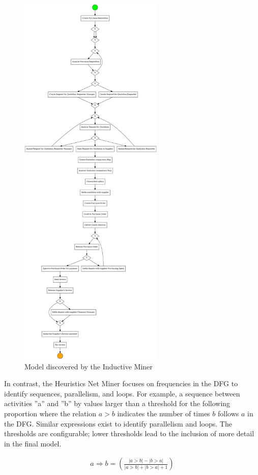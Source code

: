 \begin{figure}
\centering
\includegraphics[height=7.25in]{bpmn.png}
\caption{Model discovered by the Inductive Miner}
\label{fig:inductive_example}
\end{figure}

In contrast, the Heuristics Net Miner focuses on frequencies in the DFG to identify sequences, parallelism, and loops. For example, a sequence between activities ''a'' and ''b'' by values larger than a threshold for the following proportion where the relation $a > b$ indicates the number of times $b$ follows $a$ in the DFG. Similar expressions exist to identify parallelism and loops. The thresholds are configurable; lower thresholds lead to the inclusion of more detail in the final model.

\begin{align*}
a \Rightarrow b = \left( \frac{
| a > b| - |b > a|}{
| a > b| + |b > a| + 1}\right)
\end{align*}
 
